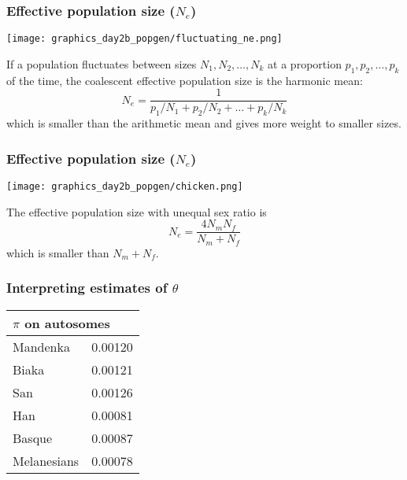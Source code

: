\documentclass{beamer}
\newcommand{\1}{\ensuremath{\mathbf{1}}}
\begin{document}
%
%
%
\begin{frame}\frametitle{Effective population size ($N_e$)}
	\begin{center}
		\texttt{[image: graphics\_day2b\_popgen/fluctuating\_ne.png]}
	\end{center}
	If a population fluctuates between sizes $N_1, N_2, \ldots, N_k$ at a proportion $p_1, p_2, \ldots, p_k$ of the time, the coalescent effective population size is the harmonic mean:
	\begin{equation}
		N_e = \frac{1}{p_1/N_1 + p_2/N_2 + \ldots + p_k/N_k}
	\end{equation}
	which is smaller than the arithmetic mean and gives more weight to smaller sizes.
\end{frame}
%
%
%
\begin{frame}\frametitle{Effective population size ($N_e$)}
	\begin{center}
		\texttt{[image: graphics\_day2b\_popgen/chicken.png]}
	\end{center}
	The effective population size with unequal sex ratio is
	\begin{equation}
		N_e = \frac{4N_m N_f}{N_m + N_f}
	\end{equation}
	which is smaller than $N_m + N_f$.
\end{frame}
%
%
%
\begin{frame}\frametitle{Interpreting estimates of $\theta$}
	\begin{center}
		\begin{tabular}{ll}
			\toprule
			\multicolumn{2}{l}{$\pi$ on autosomes}	\\
			\midrule
			Mandenka	& 0.00120	\\
			Biaka		& 0.00121	\\
			San			& 0.00126	\\
			Han			& 0.00081	\\
			Basque		& 0.00087	\\
			Melanesians	& 0.00078	\\
			\bottomrule
	   	\end{tabular}	
	\end{center}
\end{frame}
\end{document}
